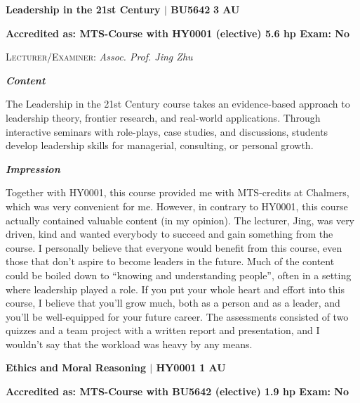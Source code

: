 \vspace{-0.4cm}
\hrulefill

\newpage

\vspace{-0.3cm}
\hrulefill

{\large{\textbf{Leadership in the 21st Century $\vert$ BU5642} \hfill \textbf{3 AU}}}

\vspace{-0.3cm}
\textbf{Accredited as: MTS-Course with HY0001 (elective) 5.6 hp \hfill Exam: No}

{\large{\textsc{Lecturer/Examiner:} \textit{Assoc. Prof. Jing Zhu}}} \vspace{0.25cm}

{\large{\textbf{\textit{Content}}}} 
\vspace{-0.25cm}

The Leadership in the 21st Century course takes an evidence-based approach to leadership theory, frontier research, and real-world applications. Through interactive seminars with role-plays, case studies, and discussions, students develop leadership skills for managerial, consulting, or personal growth.

{\large{\textbf{\textit{Impression}}}}
\vspace{-0.25cm}

Together with HY0001, this course provided me with MTS-credits at Chalmers, which was very convenient for me. However, in contrary to HY0001, this course actually contained valuable content (in my opinion). The lecturer, Jing, was very driven, kind and wanted everybody to succeed and gain something from the course. I personally believe that everyone would benefit from this course, even those that don't aspire to become leaders in the future. Much of the content could be boiled down to ``knowing and understanding people'', often in a setting where leadership played a role. If you put your whole heart and effort into this course, I believe that you'll grow much, both as a person and as a leader, and you'll be well-equipped for your future career. The assessments consisted of two quizzes and a team project with a written report and presentation, and I wouldn't say that the workload was heavy by any means.

\vspace{-0.3cm}
\hrulefill

{\large{\textbf{Ethics and Moral Reasoning $\vert$ HY0001} \hfill \textbf{1 AU}}}

\vspace{-0.3cm}
\textbf{Accredited as: MTS-Course with BU5642 (elective) 1.9 hp \hfill Exam: No}

